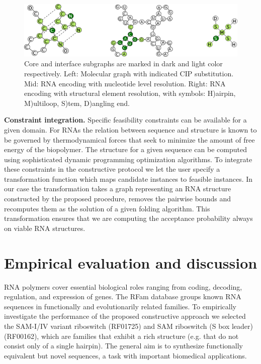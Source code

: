 \documentclass{article}
\begin{document}
\begin{figure}[ht]
      \centering
        \includegraphics[width=0.7\linewidth]{images/allcipsinone.png}
      \caption{
      Core and interface subgraphs are marked in dark and light color
      respectively. Left: Molecular graph with indicated CIP substitution.
      Mid: RNA encoding with nucleotide level resolution.  Right:  RNA encoding with structural element resolution, with symbols: H)airpin, M)ultiloop, S)tem, D)angling end.}
      \label{allcips}
\end{figure}


\textbf{Constraint integration.} Specific feasibility constraints can be
available for a given domain. For RNAs the relation between sequence and
structure is known to be governed by thermodynamical forces that seek to
minimize the amount of free energy of the biopolymer. The structure for a
given sequence can be computed using sophisticated dynamic programming
optimization algorithms. To integrate these constraints in the constructive
protocol we let the user specify a transformation function which maps
candidate instances to feasible instances. In our case the transformation
takes a graph representing an RNA structure constructed by the proposed
procedure, removes the pairwise bounds and recomputes them as the solution of
a given folding algorithm. This transformation ensures that we are computing
the acceptance probability always on viable RNA structures.


\section{Empirical evaluation and discussion}

RNA polymers cover essential biological roles ranging from coding, decoding,
regulation, and expression of genes. The RFam database \citep{rfam} groups
known RNA sequences in functionally and evolutionarily related families. To
empirically investigate the performance of the proposed constructive approach
we selected the SAM-I/IV variant riboswitch (RF01725) and SAM riboswitch (S
box leader) (RF00162), which are families that exhibit a rich structure (e.g.
that do not consist only of a single hairpin). The general aim is to
synthesize functionally equivalent but novel sequences, a task with important
biomedical applications.
\end{document}

